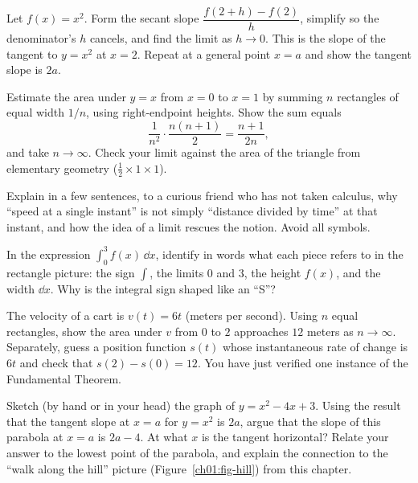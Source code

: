 \begin{exercise}
Let $f(x) = x^2$. Form the secant slope $\dfrac{f(2+h)-f(2)}{h}$, simplify so the
denominator's $h$ cancels, and find the limit as $h\to 0$. This is the slope of
the tangent to $y=x^2$ at $x=2$. Repeat at a general point $x=a$ and show the
tangent slope is $2a$.
\end{exercise}

\begin{exercise}
Estimate the area under $y = x$ from $x=0$ to $x=1$ by summing $n$ rectangles of
equal width $1/n$, using right-endpoint heights. Show the sum equals
\[
  \frac{1}{n^2}\cdot\frac{n(n+1)}{2} = \frac{n+1}{2n},
\]
and take $n\to\infty$.
Check your limit against the area of the triangle from elementary geometry ($\frac{1}{2}\times 1 \times 1$).
\end{exercise}

\begin{exercise}
Explain in a few sentences, to a curious friend who has not taken calculus, why
``speed at a single instant'' is not simply ``distance divided by time'' at that
instant, and how the idea of a limit rescues the notion. Avoid all symbols.
\end{exercise}

\begin{exercise}
In the expression $\displaystyle\int_0^3 f(x)\,\dd x$, identify in words what each
piece refers to in the rectangle picture: the sign $\int$, the limits $0$ and
$3$, the height $f(x)$, and the width $\dd x$. Why is the integral sign shaped
like an ``S''?
\end{exercise}

\begin{exercise}
The velocity of a cart is $v(t) = 6t$ (meters per second). Using $n$ equal
rectangles, show the area under $v$ from $0$ to $2$ approaches $12$ meters as
$n\to\infty$. Separately, guess a position function $s(t)$ whose instantaneous
rate of change is $6t$ and check that $s(2) - s(0) = 12$. You have just verified
one instance of the Fundamental Theorem.
\end{exercise}

\begin{exercise}
Sketch (by hand or in your head) the graph of $y = x^2 - 4x + 3$. Using the
result that the tangent slope at $x=a$ for $y=x^2$ is $2a$, argue that the slope
of this parabola at $x=a$ is $2a - 4$. At what $x$ is the tangent horizontal?
Relate your answer to the lowest point of the parabola, and explain the
connection to the ``walk along the hill'' picture (Figure~\ref{ch01:fig-hill})
from this chapter.
\end{exercise}

